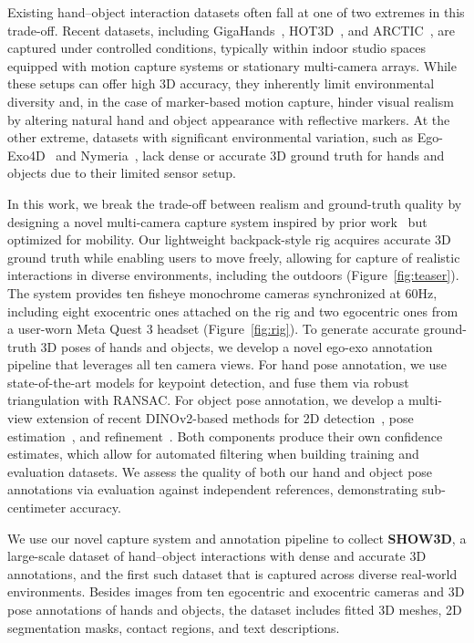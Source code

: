 \documentclass[10pt,twocolumn,letterpaper]{article}
\begin{document}
Existing hand–object interaction datasets often fall at one of two extremes in this trade-off. Recent datasets, including GigaHands~\cite{fu2025gigahands}, HOT3D~\cite{banerjee2025hot3d}, and ARCTIC~\cite{fan2023arctic}, are captured under controlled conditions, typically within indoor studio spaces equipped with motion capture systems or stationary multi-camera arrays. While these setups can offer high 3D accuracy, they inherently limit environmental diversity and, in the case of marker-based motion capture, hinder visual realism by altering natural hand and object appearance with reflective markers. At the other extreme, datasets with significant environmental variation, such as Ego-Exo4D~\cite{grauman2024ego} and Nymeria~\cite{ma2024nymeria}, lack dense or accurate 3D ground truth for hands and objects due to their limited sensor setup.

In this work, we break the trade-off between realism and ground-truth quality by designing a novel multi-camera capture system inspired by prior work~\cite{han2020megatrack} but
optimized for mobility. Our lightweight backpack-style rig acquires accurate 3D ground truth while enabling users to move freely, allowing for capture of realistic interactions in diverse environments, including the outdoors (Figure~\ref{fig:teaser}). 
The system provides ten fisheye monochrome cameras synchronized  at 60Hz, including eight exocentric ones attached on the rig and two egocentric ones from a user-worn Meta Quest 3 headset (Figure~\ref{fig:rig}).
To generate accurate ground-truth 3D poses of hands and objects, we develop a novel ego-exo annotation pipeline that leverages all ten camera views.
For hand pose annotation, we use state-of-the-art models for keypoint detection, and fuse them via robust triangulation with RANSAC.
For object pose annotation, we develop a multi-view extension of recent DINOv2-based methods for 2D detection~\cite{nguyen2023cnos}, pose estimation~\cite{ornek2024foundpose}, and refinement~\cite{nguyen2025gotrack}.
Both components produce their own confidence estimates, which allow for automated filtering when building training and evaluation datasets.
We assess the quality of both our hand and object pose annotations via evaluation against independent references, demonstrating sub-centimeter accuracy.

We use our novel capture system and annotation pipeline to collect \textbf{SHOW3D}, a large-scale dataset of hand–object interactions with dense and accurate 3D annotations, and the first such dataset that is captured across diverse real-world environments. Besides images from ten egocentric and exocentric cameras and 3D pose annotations of hands and objects, the dataset includes fitted 3D meshes, 2D segmentation masks, contact regions, and text descriptions.
\end{document}
